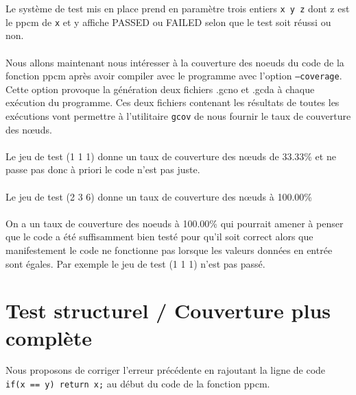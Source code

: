 \documentclass{article}
\begin{document}
\noindent Le système de test mis en place prend en paramètre trois entiers \texttt{x y z} dont \textsf{z} est le ppcm de \texttt{x} et \textsf{y} affiche \textsf{PASSED} ou \textsf{FAILED} selon que le test soit réussi ou non.
\\
\\
Nous allons maintenant nous intéresser à la couverture des noeuds du code de la fonction \textsf{ppcm} après avoir compiler avec le programme avec l'option \texttt{--coverage}. Cette option provoque la génération deux fichiers .gcno et .gcda à chaque exécution du programme. Ces deux fichiers contenant les résultats de toutes les exécutions vont permettre à l'utilitaire \texttt{gcov} de nous fournir le taux de couverture des nœuds.
\\
\\
Le jeu de test \textsf{(1 1 1)} donne un taux de couverture des nœuds de 33.33\% et ne passe pas donc à priori  le code n'est pas juste.
\\
\\
Le jeu de test \textsf{(2 3 6)} donne un taux de couverture des nœuds à 100.00\%
\\
\\
On a un taux de couverture des noeuds à 100.00\% qui pourrait amener à penser que le code a été suffisamment bien testé pour qu’il soit correct alors que manifestement le code ne fonctionne pas lorsque les valeurs données en entrée sont égales. Par exemple le jeu de test \textsf{(1 1 1)} n'est pas passé.


\section*{Test structurel / Couverture plus complète}

Nous proposons de corriger l'erreur précédente en rajoutant
la ligne de code \\ \texttt{if(x == y) return x;} au début du code de la fonction \textsf{ppcm}.
\\
\\
\end{document}
